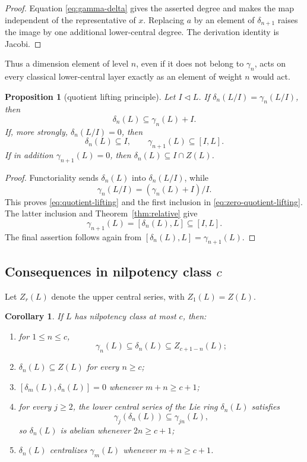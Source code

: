 \documentclass[a4paper,11pt,reqno]{amsart}
\newtheorem{proposition}[theorem]{Proposition}
\newtheorem{corollary}[theorem]{Corollary}
\theoremstyle{definition}
\theoremstyle{remark}
\newcommand{\dlt}{\delta}
\newcommand{\gm}{\gamma}
\begin{document}
\begin{proof}
Equation \eqref{eq:gamma-delta} gives the asserted degree and makes the map
independent of the representative of $x$.  Replacing $a$ by an element of
$\dlt_{n+1}$ raises the image by one additional lower-central degree.  The
derivation identity is Jacobi.
\end{proof}

Thus a dimension element of level $n$, even if it does not belong to
$\gm_n$, acts on every classical lower-central layer exactly as an element of
weight $n$ would act.

\begin{proposition}[quotient lifting principle]\label{prop:quotient-lifting}
Let $I\lhd L$.  If
\(\dlt_n(L/I)=\gm_n(L/I)\), then
\begin{equation}\label{eq:quotient-lifting}
                    \dlt_n(L)\subseteq\gm_n(L)+I.
\end{equation}
If, more strongly, $\dlt_n(L/I)=0$, then
\begin{equation}\label{eq:zero-quotient-lifting}
 \dlt_n(L)\subseteq I,\qquad
 \gm_{n+1}(L)\subseteq[I,L].
\end{equation}
If in addition $\gm_{n+1}(L)=0$, then
$\dlt_n(L)\subseteq I\cap Z(L)$.
\end{proposition}

\begin{proof}
Functoriality sends $\dlt_n(L)$ into $\dlt_n(L/I)$, while
\[
 \gm_n(L/I)=(\gm_n(L)+I)/I.
\]
This proves \eqref{eq:quotient-lifting} and the first inclusion in
\eqref{eq:zero-quotient-lifting}.  The latter inclusion and
Theorem~\ref{thm:relative} give
\[
 \gm_{n+1}(L)=[\dlt_n(L),L]\subseteq[I,L].
\]
The final assertion follows again from
$[\dlt_n(L),L]=\gm_{n+1}(L)$.
\end{proof}

\subsection{Consequences in nilpotency class \texorpdfstring{$c$}{c}}

Let $Z_r(L)$ denote the upper central series, with $Z_1(L)=Z(L)$.

\begin{corollary}\label{cor:nilpotent-structure}
If $L$ has nilpotency class at most $c$, then:
\begin{enumerate}[label=\textup{(\roman*)}]
\item for $1\leq n\leq c$,
\[
             \gm_n(L)\subseteq\dlt_n(L)\subseteq Z_{c+1-n}(L);
\]
\item $\dlt_n(L)\subseteq Z(L)$ for every $n\geq c$;
\item $[\dlt_m(L),\dlt_n(L)]=0$ whenever $m+n\geq c+1$;
\item for every $j\geq2$, the lower central series of the Lie ring
$\dlt_n(L)$ satisfies
\[
             \gm_j(\dlt_n(L))\subseteq\gm_{jn}(L),
\]
so $\dlt_n(L)$ is abelian whenever $2n\geq c+1$;
\item $\dlt_n(L)$ centralizes $\gm_m(L)$ whenever $m+n\geq c+1$.
\end{enumerate}
\end{corollary}
\end{document}
